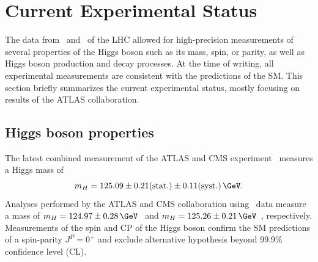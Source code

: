 



\section{Current Experimental Status}
\label{subsec:higgs-exp-status}
The data from \RunOne\ and \RunTwo\ of the LHC allowed for high-precision measurements of several properties of the Higgs boson such as its mass, spin, or parity, as well as Higgs boson production and decay processes. 
At the time of writing, all experimental measurements are consistent with the predictions of the SM.
This section briefly summarizes the current experimental status, mostly focusing on results of the ATLAS collaboration.

\subsection{Higgs boson properties}
The latest combined measurement of the ATLAS and CMS experiment~\cite{HIGG-2014-14} measures a Higgs mass of 
\begin{equation}
  m_H = 125.09 \pm 0.21\text{(stat.)} \pm 0.11\text{(syst.)}\,\GeV.
\end{equation}
Analyses performed by the ATLAS and CMS collaboration using \RunTwo\ data measure a mass of $m_H = 124.97\pm0.28\,\GeV$~\cite{ATLAS-CONF-2017-046} and $m_H = 125.26 \pm 0.21\,\GeV$~\cite{Sirunyan_2020}, respectively.
Measurements of the spin and CP of the Higgs boson confirm the SM predictions of a spin-parity $J^P = 0^+$ and exclude alternative hypothesis beyond 99.9\% confidence level (CL).~\cite{HIGG-2013-17-witherratum,CMS-HIG-14-018} 

